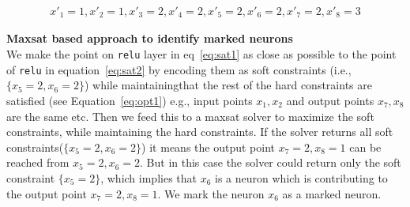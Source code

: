 \begin{equation}
    \begin{aligned}
        x'_1=1, x'_2=1, x'_3=2, x'_4=2, x'_5=2, x'_6=2, x'_7=2, x'_8=3
    \end{aligned}
\label{eq:sat2}
\end{equation}

\noindent\textbf{Maxsat based approach to identify marked neurons}\\
We make the point on \texttt{relu} layer in eq~\ref{eq:sat1} as close as possible  to the point of \texttt{relu} in equation~\ref{eq:sat2} by encoding them as soft constraints (i.e.,  $\{x_5=2, x_6=2\}$) while maintainingthat the rest of the hard constraints are satisfied (see Equation~\ref{eq:opt1}) e.g., input points $x_1,x_2$ and output points $x_7,x_8$ are the same etc. 
Then we feed this to a maxsat solver  to maximize the soft constraints, while maintaining the hard constraints.
  If the solver returns all soft constraints($\{x_5=2,x_6=2\}$) it means the output point $x_7=2, x_8=1$ can be reached from $x_5=2,x_6=2$. But in this case the solver could return only the soft constraint $\{x_5=2\}$, which implies that $x_6$ is a neuron which is contributing to the output point $x_7=2, x_8=1$. We mark the neuron $x_6$ as a marked neuron. 
  \qquad 

